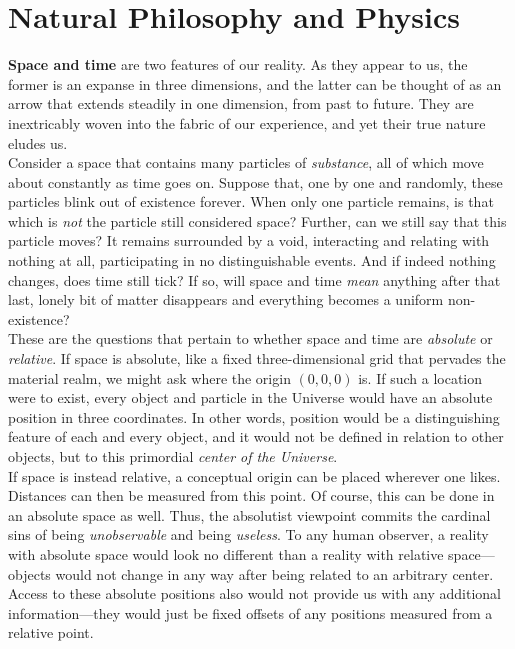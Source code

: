 
\toclineskip
\section{Natural Philosophy and Physics}

\textbf{Space and time} are two features of our reality. As they appear to us, the former is an expanse in three dimensions, and the latter can be thought of as an arrow that extends steadily in one dimension, from past to future. They are inextricably woven into the fabric of our experience, and yet their true nature eludes us. \\

Consider a space that contains many particles of \textit{substance}, all of which move about constantly as time goes on. Suppose that, one by one and randomly, these particles blink out of existence forever. When only one particle remains, is that which is \textit{not} the particle still considered space? Further, can we still say that this particle moves? It remains surrounded by a void, interacting and relating with nothing at all, participating in no distinguishable events. And if indeed nothing changes, does time still tick? If so, will space and time \textit{mean} anything after that last, lonely bit of matter disappears and everything becomes a uniform non-existence? \\

These are the questions that pertain to whether space and time are \textit{absolute} or \textit{relative}. If space is absolute, like a fixed three-dimensional grid that pervades the material realm, we might ask where the origin $(0,0,0)$ is. If such a location were to exist, every object and particle in the Universe would have an absolute position in three coordinates. In other words, position would be a distinguishing feature of each and every object, and it would not be defined in relation to other objects, but to this primordial \textit{center of the Universe}. \\

If space is instead relative, a conceptual origin can be placed wherever one likes. Distances can then be measured from this point. Of course, this can be done in an absolute space as well. Thus, the absolutist viewpoint commits the cardinal sins of being \textit{unobservable} and being \textit{useless}. To any human observer, a reality with absolute space would look no different than a reality with relative space---objects would not change in any way after being related to an arbitrary center. Access to these absolute positions also would not provide us with any additional information---they would just be fixed offsets of any positions measured from a relative point. \\

